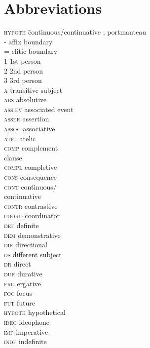 \documentclass[output=paper]{LSP/langsci}
\begin{document}
\section*{Abbreviations}
\begin{multicols}{3}
\begin{tabbing}
\textsc{hypoth}  \= continuous/continuative \kill
\textsc{;} \> portmanteau\\
\textsc{-} \> affix boundary\\
\textsc{=} \> clitic boundary\\
\textsc{1} \> 1st person\\
\textsc{2} \> 2nd person\\
\textsc{3} \> 3rd person\\
\textsc{a} \> transitive subject\\
\textsc{abs} \> absolutive\\
\textsc{ass.ev} \> associated event\\
\textsc{asser} \> assertion\\
\textsc{assoc} \> associative\\
\textsc{atel} \> atelic\\
\textsc{comp} \> complement \\ \> clause\\
\textsc{compl} \> completive\\
\textsc{cons} \> consequence\\
\textsc{cont} \> continuous/\\ \> continuative\\
\textsc{contr} \> contrastive\\
\textsc{coord} \> coordinator\\
\textsc{def} \> definite\\
\textsc{dem} \> demonstrative\\
\textsc{dir} \> directional\\
\textsc{ds} \> different subject\\
\textsc{dr} \> direct\\
\textsc{dur} \> durative\\
\textsc{erg} \> ergative\\
\textsc{foc} \> focus\\
\textsc{fut} \> future\\
\textsc{hypoth} \> hypothetical\\
\textsc{ideo} \> ideophone\\
\textsc{imp} \> imperative\\
\textsc{indf} \> indefinite\\

\end{tabbing}
\end{multicols}
\end{document}
